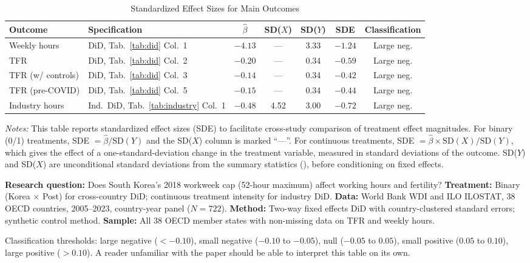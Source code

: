 \documentclass[12pt]{article}
\begin{document}
\begin{table}[H]
\centering
\caption{Standardized Effect Sizes for Main Outcomes}
\label{tab:sde}
\begin{adjustbox}{max width=\textwidth}
\begin{tabular}{llccccc}
\toprule
Outcome & Specification & $\hat{\beta}$ & SD($X$) & SD($Y$) & SDE & Classification \\
\midrule
Weekly hours      & DiD, Tab.~\ref{tab:did} Col.~1   & $-4.13$ & ---  & 3.33 & $-1.24$ & Large neg. \\
TFR               & DiD, Tab.~\ref{tab:did} Col.~2   & $-0.20$ & ---  & 0.34 & $-0.59$ & Large neg. \\
TFR (w/ controls) & DiD, Tab.~\ref{tab:did} Col.~3   & $-0.14$ & ---  & 0.34 & $-0.42$ & Large neg. \\
TFR (pre-COVID)   & DiD, Tab.~\ref{tab:did} Col.~5   & $-0.15$ & ---  & 0.34 & $-0.44$ & Large neg. \\
Industry hours    & Ind.\ DiD, Tab.~\ref{tab:industry} Col.~1 & $-0.48$ & 4.52 & 3.00 & $-0.72$ & Large neg. \\
\bottomrule
\end{tabular}
\end{adjustbox}
\par\vspace{0.3em}
{\footnotesize \emph{Notes:} This table reports standardized effect sizes (SDE)
to facilitate cross-study comparison of treatment effect magnitudes.
For binary (0/1) treatments, SDE $= \hat{\beta} / \text{SD}(Y)$ and the SD($X$)
column is marked ``---''.
For continuous treatments, SDE $= \hat{\beta} \times \text{SD}(X) / \text{SD}(Y)$,
which gives the effect of a one-standard-deviation change in the treatment variable,
measured in standard deviations of the outcome.
SD($Y$) and SD($X$) are unconditional standard deviations from the summary
statistics (), before conditioning on fixed effects.

\textbf{Research question:} Does South Korea's 2018 workweek cap (52-hour maximum) affect working hours and fertility?
\textbf{Treatment:} Binary (Korea $\times$ Post) for cross-country DiD; continuous treatment intensity for industry DiD.
\textbf{Data:} World Bank WDI and ILO ILOSTAT, 38 OECD countries, 2005--2023, country-year panel ($N = 722$).
\textbf{Method:} Two-way fixed effects DiD with country-clustered standard errors; synthetic control method.
\textbf{Sample:} All 38 OECD member states with non-missing data on TFR and weekly hours.

Classification thresholds:
large negative ($< -0.10$), small negative ($-0.10$ to $-0.05$),
null ($-0.05$ to $0.05$), small positive ($0.05$ to $0.10$),
large positive ($> 0.10$).
A reader unfamiliar with the paper should be able to interpret this table
on its own.}
\end{table}
\end{document}
